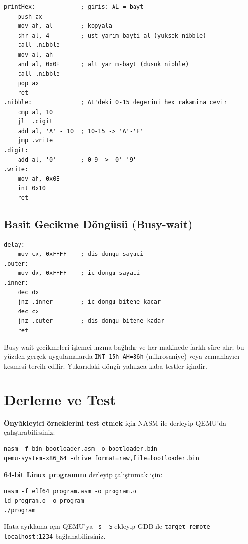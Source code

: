 \documentclass[11pt,a4paper]{article}
\newcommand{\kod}[1]{\texttt{\color{koyuGri}#1}}
\begin{document}
\begin{ornekkutu}
\begin{lstlisting}
printHex:             ; giris: AL = bayt
    push ax
    mov ah, al        ; kopyala
    shr al, 4         ; ust yarim-bayti al (yuksek nibble)
    call .nibble
    mov al, ah
    and al, 0x0F      ; alt yarim-bayt (dusuk nibble)
    call .nibble
    pop ax
    ret
.nibble:              ; AL'deki 0-15 degerini hex rakamina cevir
    cmp al, 10
    jl  .digit
    add al, 'A' - 10  ; 10-15 -> 'A'-'F'
    jmp .write
.digit:
    add al, '0'       ; 0-9 -> '0'-'9'
.write:
    mov ah, 0x0E
    int 0x10
    ret
\end{lstlisting}
\end{ornekkutu}

\subsection{Basit Gecikme Döngüsü (Busy-wait)}

\begin{ornekkutu}
\begin{lstlisting}
delay:
    mov cx, 0xFFFF    ; dis dongu sayaci
.outer:
    mov dx, 0xFFFF    ; ic dongu sayaci
.inner:
    dec dx
    jnz .inner        ; ic dongu bitene kadar
    dec cx
    jnz .outer        ; dis dongu bitene kadar
    ret
\end{lstlisting}
\end{ornekkutu}

\begin{uyarikutu}
Busy-wait gecikmeleri işlemci hızına bağlıdır ve her makinede farklı süre
alır; bu yüzden gerçek uygulamalarda \kod{INT 15h AH=86h} (mikrosaniye) veya
zamanlayıcı kesmesi tercih edilir. Yukarıdaki döngü yalnızca kaba testler
içindir.
\end{uyarikutu}

\section{Derleme ve Test}

\begin{ipucukutu}
\textbf{Önyükleyici örneklerini test etmek} için NASM ile derleyip QEMU'da
çalıştırabilirsiniz:
\begin{lstlisting}[numbers=none]
nasm -f bin bootloader.asm -o bootloader.bin
qemu-system-x86_64 -drive format=raw,file=bootloader.bin
\end{lstlisting}
\textbf{64-bit Linux programını} derleyip çalıştırmak için:
\begin{lstlisting}[numbers=none]
nasm -f elf64 program.asm -o program.o
ld program.o -o program
./program
\end{lstlisting}
Hata ayıklama için QEMU'ya \kod{-s -S} ekleyip GDB ile \kod{target remote
localhost:1234} bağlanabilirsiniz.
\end{ipucukutu}
\end{document}
